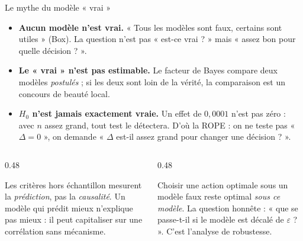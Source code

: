 \begin{frame}{Le mythe du modèle « vrai »}
\begin{kbox}
\begin{itemize}
  \item \textbf{Aucun modèle n'est vrai.} « Tous les modèles sont faux,
        certains sont utiles » (Box). La question n'est pas « est-ce vrai ? »
        mais « assez bon pour quelle décision ? ».
  \item \textbf{Le « vrai » n'est pas estimable.} Le facteur de Bayes
        compare deux modèles \emph{postulés} ; si les deux sont loin de la
        vérité, la comparaison est un concours de beauté local.
  \item \textbf{$H_0$ n'est jamais exactement vraie.} Un effet de
        $0{,}0001$ n'est pas zéro : avec $n$ assez grand, tout test le
        détectera. D'où la ROPE : on ne teste pas « $\Delta = 0$ », on
        demande « $\Delta$ est-il assez grand pour changer une décision ? ».
\end{itemize}
\end{kbox}
\vspace{1mm}
\begin{columns}[t]
\begin{column}{0.48\textwidth}
\begin{ebox}
Les critères hors échantillon mesurent la \emph{prédiction}, pas la
\emph{causalité}. Un modèle qui prédit mieux n'explique pas mieux : il
peut capitaliser sur une corrélation sans mécanisme.
\end{ebox}
\end{column}
\begin{column}{0.48\textwidth}
\begin{ebox}
Choisir une action optimale sous un modèle faux reste optimal
\emph{sous ce modèle}. La question honnête : « que se passe-t-il si le
modèle est décalé de $\varepsilon$ ? ». C'est l'analyse de robustesse.
\end{ebox}
\end{column}
\end{columns}
\end{frame}


